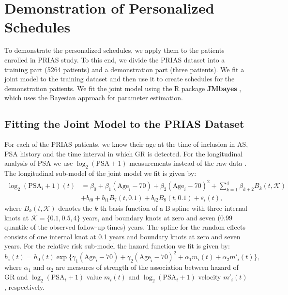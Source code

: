 
\section{Demonstration of Personalized Schedules}
\label{sec : pers_schedule_PRIAS}
To demonstrate the personalized schedules, we apply them to the patients enrolled in PRIAS study. To this end, we divide the PRIAS dataset into a training part (5264 patients) and a demonstration part (three patients). We fit a joint model to the training dataset and then use it to create schedules for the demonstration patients. We fit the joint model using the R package \textbf{JMbayes} \citep{rizopoulosJMbayes}, which uses the Bayesian approach for parameter estimation.

\subsection{Fitting the Joint Model to the PRIAS Dataset}
\label{subsec : jm_fit_prias}
For each of the PRIAS patients, we know their age at the time of inclusion in AS, PSA history and the time interval in which GR is detected. For the longitudinal analysis of PSA we use $\log_2 (\mbox{PSA} + 1)$ measurements instead of the raw data \citep{lin2000latent,pearson1994mixed}. The longitudinal sub-model of the joint model we fit is given by:
\begin{equation}
\label{eq : long_model_prias}
\begin{aligned}
    \log_2 (\mbox{PSA}_i + 1)(t) &= \beta_0 + \beta_1 (\mbox{Age}_i-70) + \beta_2 (\mbox{Age}_i-70)^2 + \sum_{k=1}^4 \beta_{k+2} B_k(t,\mathcal{K})\\ 
    &+  b_{i0} + b_{i1} B_7(t, 0.1) + b_{i2} B_8(t, 0.1) +
    \varepsilon_i(t),
    \end{aligned}
\end{equation}
where $B_k(t, \mathcal{K})$ denotes the $k$-th basis function of a B-spline with three internal knots at $\mathcal{K} =\{0.1, 0.5, 4\}$ years, and boundary knots at zero and seven (0.99 quantile of the observed follow-up times) years. The spline for the random effects consists of one internal knot at 0.1 years and boundary knots at zero and seven years. For the relative risk sub-model the hazard function we fit is given by:
\begin{equation}
\label{eq : hazard_prias}
h_i(t) = h_0(t) \exp\big\{\gamma_1 (\mbox{Age}_i-70)  + \gamma_2 (\mbox{Age}_i-70)^2 + \alpha_1 m_i(t) + \alpha_2 m'_i(t)\big\},
\end{equation}
where $\alpha_1$ and $\alpha_2$ are measures of strength of the association between hazard of GR and $\log_2 (\mbox{PSA}_i + 1)$ value $m_i(t)$ and $\log_2 (\mbox{PSA}_i + 1)$ velocity $m'_i(t)$, respectively.

